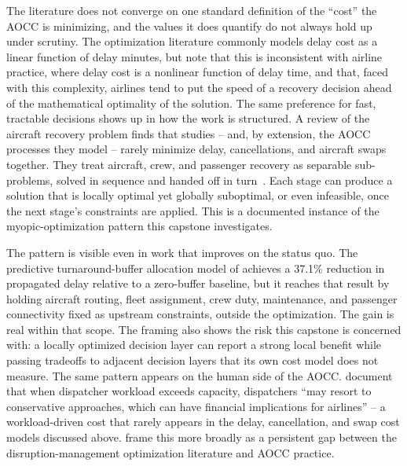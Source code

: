 The literature does not converge on one standard definition of the ``cost'' the AOCC is minimizing, and the values it does quantify do not always hold up under scrutiny. The optimization literature commonly models delay cost as a linear function of delay minutes, but \textcite{hu2024disruptionOptReview} note that this is inconsistent with airline practice, where delay cost is a nonlinear function of delay time, and that, faced with this complexity, airlines tend to put the speed of a recovery decision ahead of the mathematical optimality of the solution. The same preference for fast, tractable decisions shows up in how the work is structured. A review of the aircraft recovery problem finds that studies -- and, by extension, the AOCC processes they model -- rarely minimize delay, cancellations, and aircraft swaps together. They treat aircraft, crew, and passenger recovery as separable sub-problems, solved in sequence and handed off in turn~\cite{santana2023arpReview}. Each stage can produce a solution that is locally optimal yet globally suboptimal, or even infeasible, once the next stage's constraints are applied. This is a documented instance of the myopic-optimization pattern this capstone investigates.

The pattern is visible even in work that improves on the status quo. The predictive turnaround-buffer allocation model of \textcite{kontodimou2026turnaroundBuffer} achieves a 37.1\% reduction in propagated delay relative to a zero-buffer baseline, but it reaches that result by holding aircraft routing, fleet assignment, crew duty, maintenance, and passenger connectivity fixed as upstream constraints, outside the optimization. The gain is real within that scope. The framing also shows the risk this capstone is concerned with: a locally optimized decision layer can report a strong local benefit while passing tradeoffs to adjacent decision layers that its own cost model does not measure. The same pattern appears on the human side of the AOCC. \textcite{dispatcherWorkload2025} document that when dispatcher workload exceeds capacity, dispatchers ``may resort to conservative approaches, which can have financial implications for airlines'' -- a workload-driven cost that rarely appears in the delay, cancellation, and swap cost models discussed above. \textcite{hassanDisruptionReview} frame this more broadly as a persistent gap between the disruption-management optimization literature and AOCC practice.

